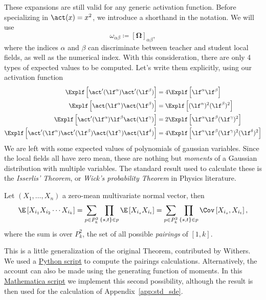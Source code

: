 These expansions are still valid for any generic activation function.
Before specializing in \(\act(x)=x^2\), we introduce a shorthand in the notation.
We will use \[\omega_{\alpha\beta} \coloneqq \left[\bm{\Omega}\right]_{\alpha\beta},\]
where the indices \(\alpha\) and \(\beta\) can discriminate between teacher and student local fields, as well as the numerical index.
With this consideration, there are only 4 types of expected values to be computed.
Let's write them explicitly, using our activation function
\[\begin{split}
  \Explf  \left[\act' (\lf^\alpha)  \act' (\lf^\beta)  \right] &= 
  4 \Explf  \left[\lf^\alpha \lf^\beta \right] \\
  \Explf  \left[\act(\lf^\alpha)  \act(\lf^\beta)  \right] &= 
  \Explf  \left[(\lf^\alpha)^2 (\lf^\beta)^2 \right] \\
  \Explf  \left[\act'(\lf^\alpha) \lf^\beta \act(\lf^\gamma) \right] &= 
  2\Explf  \left[\lf^\alpha \lf^\beta (\lf^\gamma)^2\right] \\
  \Explf  \left[\act'(\lf^\alpha) \act'(\lf^\beta) \act(\lf^\gamma) \act(\lf^\delta) \right] &= 
  4\Explf  \left[\lf^\alpha \lf^\beta (\lf^\gamma)^2 (\lf^\delta)^2\right] \\
\end{split}\]
We are left with some expected values of polynomials of gaussian variables. 
Since the local fields all have zero mean, these are nothing but \emph{moments} 
of a Gaussian distribution with multiple variables.
The standard result used to calculate these is the \emph{Isserlis' Theorem}, or 
\emph{Wick's probability Theorem} in Physics literature.
\begin{Theorem}
  Let \((X_1,\dots,X_n)\) a zero-mean multivariate normal vector,
  then
  \[
    \E\left[X_{i_1}X_{i_2}\cdots X_{i_k}\right] =
      \sum_{p\in P^2_k}\prod_{\{s,t\}\in p} \E\left[X_{i_s}X_{i_t}\right] =
      \sum_{p\in P^2_k}\prod_{\{s,t\}\in p} \Cov\left[X_{i_s},X_{i_t}\right],
  \]
  where the sum is over \(P^2_k\), the set of all possible \emph{pairings} of \([1,k]\).
\end{Theorem}
This is a little generalization of the original Theorem, contributed by Withers\cite{withers1985moments}.
We used a \href{https://github.com/arn4/master-thesis/blob/main/analytical-calculations%20/isserlis.py}{Python script} to compute the pairings calculations.
Alternatively, the account can also be made using the generating function of moments.
In this \href{https://github.com/arn4/master-thesis/blob/main/analytical-calculations%20/isserlis.nb}{Mathematica script} we implement this second possibility, 
although the result is then used for the calculation of Appendix~\ref{app:std_sde}.


